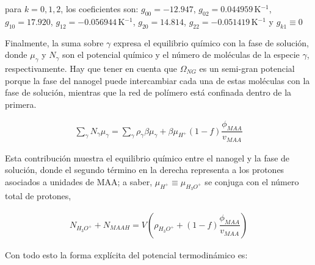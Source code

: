 	
	\noindent para  $k=0,1,2$, los coeficientes son: $g_{00}= -12.947$, $g_{02}=0.044959\,$K$^{-1}$, $g_{10}= 17.920$, $g_{12}= -0.056944$\,K$^{-1}$, $g_{20}= 14.814$, $g_{22}= -0.051419$\,K$^{-1}$  y $g_{k1}\equiv 0$ \cite{afroze2000}
	
	
	
	
	Finalmente, la suma sobre  $\gamma$ expresa el equilibrio qu\'imico con la fase de soluci\'on, donde $\mu_\gamma$ y $N_\gamma$ son el potencial qu\'imico y el n\'umero de mol\'eculas de la especie $\gamma$, respectivamente.
	Hay que tener en cuenta que $\Omega_{NG}$ es un semi-gran potencial porque la fase del nanogel puede intercambiar cada una de estas mol\'eculas con la fase de soluci\'on, mientras que la red de pol\'imero est\'a confinada dentro de la primera.
	
	
	\begin{align}
		\sum_\gamma N_\gamma \mu_\gamma = \sum_{\gamma }{\rho_\gamma\beta\mu_\gamma}
		+ \beta\mu_{H^+}(1-f)\dfrac{\phi_{MAA}}{v_{MAA}}
	\end{align}
	
	Esta contribuci\'on muestra el equilibrio qu\'imico entre el nanogel y la fase de soluci\'on, donde el segundo t\'ermino en la derecha representa a los protones asociados a unidades de MAA;
	a saber, $\mu_{H^+}\equiv\mu_{H_3O^+}$ se conjuga con el n\'umero total de protones,
	
	\begin{align}
		N_{H_3O^+}+N_{MAAH}=V\left(\rho_{H_3O^+}+(1-f)\dfrac{\phi_{MAA}}{v_{MAA}}\right)
		\label{eq:mc:equilibrio}
	\end{align}
	
	
	
	Con todo esto la forma expl\'icita del potencial termodin\'amico es:
	
	
	
